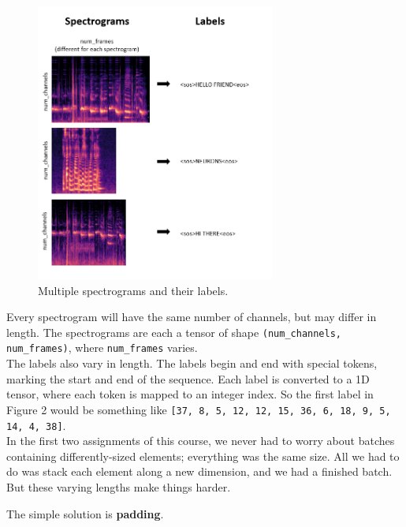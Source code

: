 \documentclass{article}
\newcommand{\ttt}[1]{\texttt{#1}}
\begin{document}
\begin{figure}[h]
\centering
\includegraphics[width=0.7\textwidth]{images/spectrograms.png}
\caption{Multiple spectrograms and their labels.}
\end{figure}

Every spectrogram will have the same number of channels, but may differ in length. The spectrograms are each a tensor of shape \ttt{(num\_channels, num\_frames)}, where \ttt{num\_frames} varies.\\

The labels also vary in length. The labels begin and end with special tokens, marking the start and end of the sequence. Each label is converted to a 1D tensor, where each token is mapped to an integer index. So the first label in Figure 2 would be something like \ttt{[37, 8, 5, 12, 12, 15, 36, 6, 18, 9, 5, 14, 4, 38]}.\\

In the first two assignments of this course, we never had to worry about batches containing differently-sized elements; everything was the same size. All we had to do was stack each element along a new dimension, and we had a finished batch. \\

But these varying lengths make things harder.

\newpage

The simple solution is \textbf{padding}. \\
\end{document}
